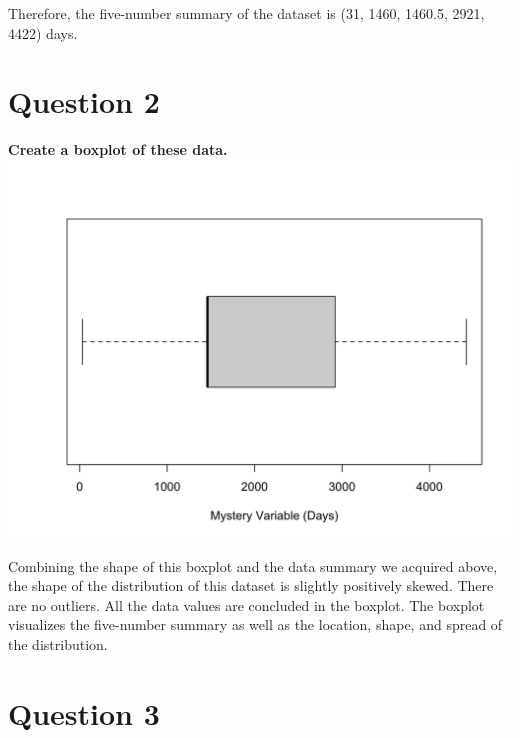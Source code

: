 \documentclass[
]{book}
\begin{document}
Therefore, the five-number summary of the dataset is (31, 1460, 1460.5, 2921, 4422) days.

\section{Question 2}\label{question-2}

\textbf{Create a boxplot of these data.}
\includegraphics{unnamed-chunk-2-1.png}

Combining the shape of this boxplot and the data summary we acquired above, the shape of the distribution of this dataset is slightly positively skewed. There are no outliers. All the data values are concluded in the boxplot. The boxplot visualizes the five-number summary as well as the location, shape, and spread of the distribution.

\section{Question 3}\label{question-3}
\end{document}
